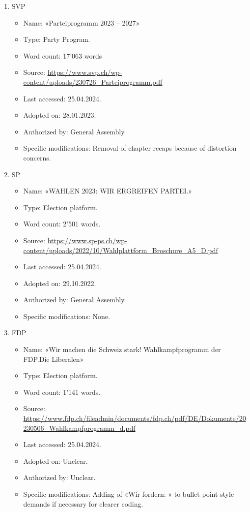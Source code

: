 \documentclass[11pt,a4paper]{article}
\begin{document}
\begin{enumerate}
    \item SVP
    \begin{itemize}
        \item Name: «Parteiprogramm 2023 – 2027»
        \item Type: Party Program.
        \item Word count: 17’063 words
        \item Source: \href{https://www.svp.ch/wp-content/uploads/230726_Parteiprogramm.pdf}{https://www.svp.ch/wp-content/uploads/230726\_Parteiprogramm.pdf}
        \item Last accessed: 25.04.2024.
        \item Adopted on: 28.01.2023.
        \item Authorized by: General Assembly.
        \item Specific modifications: Removal of chapter recaps because of distortion concerns.
    \end{itemize}
\item SP
    \begin{itemize}
        \item Name: «WAHLEN 2023: WIR ERGREIFEN PARTEI.»
        \item Type: Election platform.
        \item Word count: 2’501 words.
        \item Source: \href{https://www.sp-ps.ch/wp-content/uploads/2022/10/Wahlplattform_Broschure_A5_D.pdf}{https://www.sp-ps.ch/wp-content/uploads/2022/10/Wahlplattform\_Broschure\_A5\_D.pdf}
        \item Last accessed: 25.04.2024.
        \item Adopted on: 29.10.2022.
        \item Authorized by: General Assembly.
        \item Specific modifications: None.
    \end{itemize}

\newpage
\item FDP
    \begin{itemize}
        \item Name: «Wir machen die Schweiz stark! Wahlkampfprogramm der FDP.Die Liberalen»
        \item Type: Election platform.
        \item Word count: 1'141 words.
        \item Source: \url{https://www.fdp.ch/fileadmin/documents/fdp.ch/pdf/DE/Dokumente/20230506_Wahlkampfprogramm_d.pdf}
        \item Last accessed: 25.04.2024.
        \item Adopted on: Unclear.
        \item Authorized by: Unclear.
        \item Specific modifications: Adding of «Wir fordern: » to bullet-point style demands if necessary for clearer coding.
    \end{itemize}


\end{enumerate}
\end{document}
